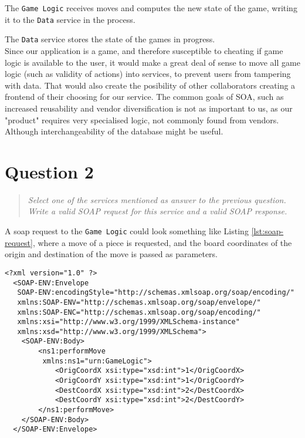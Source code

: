 \documentclass[10pt,a4paper]{report}
\begin{document}
The \texttt{Game Logic} receives moves and computes the new state of the game, writing it to the \texttt{Data} service in the process.

The \texttt{Data} service stores the state of the games in progress.\\

\noindent Since our application is a game, and therefore susceptible to cheating if game logic is available to the user, it would make a great deal of sense to move all game logic (such as validity of actions) into services, to prevent users from tampering with data. That would also create the posibility of other collaborators creating a frontend of their choosing for our service. The common goals of SOA, such as increased reusability and vendor diversification is not as important to us, as our "product" requires very specialised logic, not commonly found from vendors. Although interchangeability of the database might be useful. 

\section{Question 2}
\begin{quote}
\textit{Select one of the services mentioned as answer to the previous question. Write a valid SOAP request for this service and a valid SOAP response.}
\end{quote}

A soap request to the \texttt{Game Logic} could look something like Listing \ref{lst:soap-request}, where a move of a piece is requested, and the board coordinates of the origin and destination of the move is passed as parameters.

\begin{lstlisting}[caption="SOAP request", label={lst:soap-request}]
 <?xml version="1.0" ?>
  <SOAP-ENV:Envelope
   SOAP-ENV:encodingStyle="http://schemas.xmlsoap.org/soap/encoding/"
   xmlns:SOAP-ENV="http://schemas.xmlsoap.org/soap/envelope/"
   xmlns:SOAP-ENC="http://schemas.xmlsoap.org/soap/encoding/"
   xmlns:xsi="http://www.w3.org/1999/XMLSchema-instance"
   xmlns:xsd="http://www.w3.org/1999/XMLSchema">
	<SOAP-ENV:Body>
		<ns1:performMove
		 xmlns:ns1="urn:GameLogic">
			<OrigCoordX xsi:type="xsd:int">1</OrigCoordX>
			<OrigCoordY xsi:type="xsd:int">1</OrigCoordY>
			<DestCoordX xsi:type="xsd:int">2</DestCoordX>
			<DestCoordY xsi:type="xsd:int">2</DestCoordY>
		</ns1:performMove>
	</SOAP-ENV:Body>
  </SOAP-ENV:Envelope>
\end{lstlisting}
\end{document}
